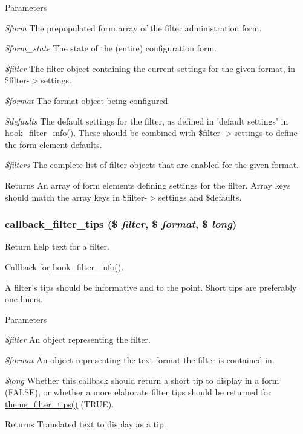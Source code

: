 \begin{DoxyParams}{Parameters}
\item[{\em \$form}]The prepopulated form array of the filter administration form. \item[{\em \$form\_\-state}]The state of the (entire) configuration form. \item[{\em \$filter}]The filter object containing the current settings for the given format, in \$filter-\/$>$settings. \item[{\em \$format}]The format object being configured. \item[{\em \$defaults}]The default settings for the filter, as defined in 'default settings' in \hyperlink{group__hooks_gaf2a2f2a46589420df896a0d42247f15a}{hook\_\-filter\_\-info()}. These should be combined with \$filter-\/$>$settings to define the form element defaults. \item[{\em \$filters}]The complete list of filter objects that are enabled for the given format.\end{DoxyParams}
\begin{DoxyReturn}{Returns}
An array of form elements defining settings for the filter. Array keys should match the array keys in \$filter-\/$>$settings and \$defaults. 
\end{DoxyReturn}
\hypertarget{group__callbacks_gabe5ee7c795e0adac0bccb8061006949e}{
\subsubsection[{callback\_\-filter\_\-tips}]{\setlength{\rightskip}{0pt plus 5cm}callback\_\-filter\_\-tips (\$ {\em filter}, \/  \$ {\em format}, \/  \$ {\em long})}}
\label{group__callbacks_gabe5ee7c795e0adac0bccb8061006949e}
Return help text for a filter.

Callback for \hyperlink{group__hooks_gaf2a2f2a46589420df896a0d42247f15a}{hook\_\-filter\_\-info()}.

A filter's tips should be informative and to the point. Short tips are preferably one-\/liners.


\begin{DoxyParams}{Parameters}
\item[{\em \$filter}]An object representing the filter. \item[{\em \$format}]An object representing the text format the filter is contained in. \item[{\em \$long}]Whether this callback should return a short tip to display in a form (FALSE), or whether a more elaborate filter tips should be returned for \hyperlink{group__themeable_ga573322311613c1d8f1de3ff1eb8a7af8}{theme\_\-filter\_\-tips()} (TRUE).\end{DoxyParams}
\begin{DoxyReturn}{Returns}
Translated text to display as a tip. 
\end{DoxyReturn}
